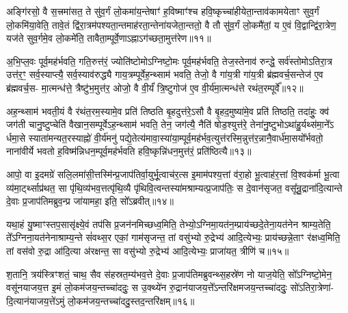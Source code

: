 {\anuvakamend[{स॒प्त॒द॒शम॑न्त॒र्यन्ति॑ वि॒राजीति॒ चतु॑श्चत्वारिꣳशच्च॥३॥}]}

अङ्गि॑रसो॒ वै स॒त्त्रमा॑सत॒ ते सु॑व॒र्गं लो॒कमा॑य॒न्तेषाꣳ॑ ह॒विष्माꣳ॑श्च हवि॒ष्कृच्चा॑हीयेता॒न्ताव॑कामयेताꣳ सुव॒र्गं लो॒कमि॑या॒वेति॒ तावे॒तं द्वि॑रा॒त्रम॑पश्यता॒न्तमाह॑रता॒न्तेना॑यजेता॒न्ततो॒ वै तौ सु॑व॒र्गं लो॒कमै॑तां॒ य ए॒वं वि॒द्वान्द्वि॑रा॒त्रेण॒ यज॑ते सुव॒र्गमे॒व लो॒कमे॑ति॒ तावैता॒म्पूर्वे॒णा\-ऽह्ना\-ऽग॑च्छता॒मुत्त॑रेण॥११॥

अ॒भि॒प्ल॒वः पूर्व॒मह॑र्भवति॒ गति॒रुत्त॑रं॒ ज्योति॑ष्टोमो\-ऽग्निष्टो॒मः पूर्व॒मह॑र्भवति॒ तेज॒स्तेनाव॑ रुन्द्धे॒ सर्व॑स्तोमो\-ऽतिरा॒त्र उत्त॑र॒ꣳ॒ सर्व॒स्याप्त्यै॒ सर्व॒स्याव॑रुद्ध्यै गाय॒त्रम्पूर्वेह॒न्थ्साम॑ भवति॒ तेजो॒ वै गा॑य॒त्री गा॑य॒त्री ब्र॑ह्मवर्च॒सन्तेज॑ ए॒व ब्र॑ह्मवर्च॒स- मा॒त्मन्ध॑त्ते॒ त्रैष्टु॑भ॒मुत्त॑र॒ ओजो॒ वै वी॒र्यं॑ त्रि॒ष्टुगोज॑ ए॒व वी॒र्य॑मा॒त्मन्ध॑त्ते रथंत॒रम्पूर्वे᳚॥१२॥

अह॒न्थ्साम॑ भवती॒यं वै र॑थंत॒रम॒स्यामे॒व प्रति॑ तिष्ठति बृ॒हदुत्त॑रे॒\-ऽसौ वै बृ॒हद॒मुष्या॑मे॒व प्रति॑ तिष्ठति॒ तदा॑हुः॒ क्व॑ जग॑ती चानु॒ष्टुप्चेति॑ वैखान॒सम्पूर्वे\-ऽह॒न्थ्साम॑ भवति॒ तेन॒ जग॑त्यै॒ नैति॑ षोड॒श्युत्त॑रे॒ तेना॑नु॒ष्टुभो\-ऽथा॑हु॒र्यथ्स॑मा॒ने᳚\-ऽ र्धमा॒से स्याता॑मन्यत॒रस्याह्नो॑ वी॒र्य॑मनु॑ पद्ये॒तेत्य॑मावा॒स्या॑या॒म्पूर्व॒मह॑र्भव॒त्युत्त॑रस्मि॒न्नुत्त॑र॒न्नानै॒वार्ध॑मा॒सयो᳚र्भवतो॒ नाना॑वीर्ये भवतो ह॒विष्म॑न्निधन॒म्पूर्व॒मह॑र्भवति हवि॒ष्कृन्नि॑धन॒मुत्त॑रं॒ प्रति॑ष्ठित्यै॥१३॥

{}

आपो॒ वा इ॒दमग्रे॑ सलि॒लमा॑सी॒त्तस्मि॑न्प्र॒जाप॑तिर्वा॒युर्भू॒त्वाच॑र॒त्स इ॒माम॑पश्य॒त्तां व॑रा॒हो भू॒त्वाह॑र॒त्तां वि॒श्वक॑र्मा भू॒त्वा व्य॑मा॒र्ट्थ्साप्र॑थत॒ सा पृ॑थि॒व्य॑भव॒त्तत्पृ॑थि॒व्यै पृ॑थिवि॒त्वन्तस्या॑मश्राम्यत्प्र॒जाप॑तिः॒ स दे॒वान॑सृजत॒ वसू᳚न्रु॒द्राना॑दि॒त्यान्ते दे॒वाः प्र॒जाप॑तिमब्रुव॒न्प्र जा॑यामहा॒ इति॒ सो᳚\-ऽब्रवीत्॥१४॥

यथा॒हं यु॒ष्माꣳस्तप॒सासृ॑क्ष्ये॒वं तप॑सि प्र॒जन॑नमिच्छध्व॒मिति॒ तेभ्यो॒\-ऽग्निमा॒यत॑न॒म्प्राय॑च्छदे॒तेना॒यत॑नेन श्राम्य॒तेति॒ ते᳚\-ऽग्निना॒यत॑नेनाश्राम्य॒न्ते सं॑वथ्स॒र एकां॒ गाम॑सृजन्त॒ तां वसु॑भ्यो रु॒द्रेभ्य॑ आदि॒त्येभ्यः॒ प्राय॑च्छन्ने॒ताꣳ र॑क्षध्व॒मिति॒ तां वस॑वो रु॒द्रा आ॑दि॒त्या अ॑रक्षन्त॒ सा वसु॑भ्यो रु॒द्रेभ्य॑ आदि॒त्येभ्यः॒ प्राजा॑यत॒ त्रीणि॑ च॥१५॥

श॒तानि॒ त्रय॑स्त्रिꣳशतं॒ चाथ॒ सैव स॑हस्रत॒म्य॑भव॒त्ते दे॒वाः प्र॒जाप॑तिमब्रुवन्थ्स॒हस्रे॑ण नो याज॒येति॒ सो᳚\-ऽग्निष्टो॒मेन॒ वसू॑नयाजय॒त्त इ॒मं लो॒कम॑जय॒न्तच्चा॑ददुः॒ स उ॒क्थ्ये॑न रु॒द्रान॑याजय॒त्ते᳚\-ऽन्तरि॑क्षमजय॒न्तच्चा॑ददुः॒ सो॑\-ऽतिरा॒त्रेणा॑- दि॒त्यान॑याजय॒त्ते॑\-ऽमुं लो॒कम॑जय॒न्तच्चा॑ददु॒स्तद॒न्तरि॑क्षम्॥१६॥

